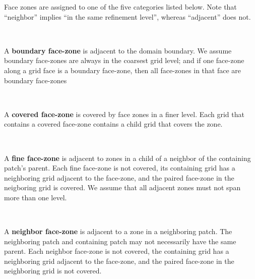 \documentclass[10pt]{article}
\begin{document}
Face zones are assigned to one of the five categories listed below.
Note that ``neighbor'' implies ``in the same refinement level'',
whereas ``adjacent'' does not.


\begin{minipage}{1in}
\end{minipage} \
\begin{minipage}{5.8in}
 A \textbf{boundary face-zone} is adjacent to the domain boundary.  We
assume boundary face-zones are always in the coarsest grid level; and
if one face-zone along a grid face is a boundary face-zone, then all
face-zones in that face are boundary face-zones
\end{minipage}

\begin{minipage}{1in}
\end{minipage} \
\begin{minipage}{5.8in}
A \textbf{covered face-zone} is covered by face zones in a finer
level.  Each grid that contains a covered face-zone contains a child
grid that covers the zone.
\end{minipage}

\begin{minipage}{1in}
\end{minipage} \
\begin{minipage}{5.8in}
A \textbf{fine face-zone} is adjacent to zones in a child of a
neighbor of the containing patch's parent.  Each fine face-zone is not
covered, its containing grid has a neighboring grid adjacent to the
face-zone, and the paired face-zone in the neigboring grid is covered.
We assume that all adjacent zones must not span more than one level.
\end{minipage}


\begin{minipage}{1in}
\end{minipage} \
\begin{minipage}{5.8in}
A \textbf{neighbor face-zone} is adjacent to a zone in a neighboring
patch.  The neighboring patch and containing patch may not necessarily
have the same parent.  Each neighbor face-zone is not covered, the
containing grid has a neighboring grid adjacent to the face-zone, and
the paired face-zone in the neighboring grid is not covered.
\end{minipage}
\end{document}
